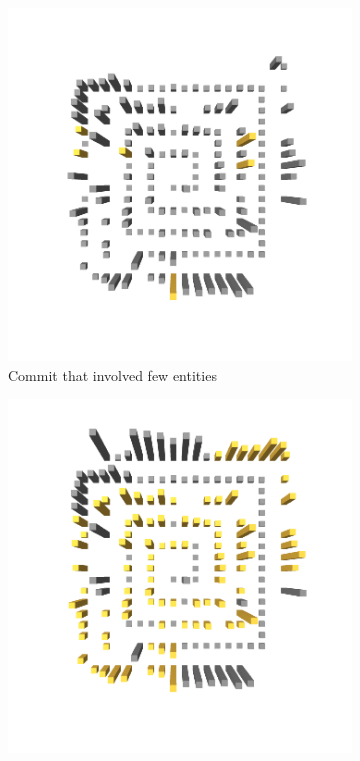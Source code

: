 \begin{figure}[t]
    \begin{subfigure}{0.42\textwidth}
        \includegraphics[width=\linewidth]{JetUML_V0E0.png}
        \caption{Commit that involved few entities} \label{fig:JetUML_V0E0}
    \end{subfigure}
    \hspace*{\fill}
    \begin{subfigure}{0.42\textwidth}
        \includegraphics[width=\linewidth]{JetUML_V0E1.png}

\end{subfigure}
\end{figure}
